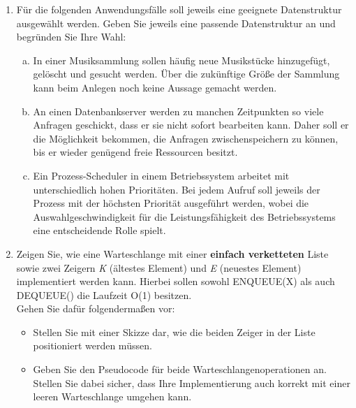 \documentclass{scrartcl}
\begin{document}
\begin{enumerate}[(1)]
\item Für die folgenden Anwendungsfälle soll jeweils eine geeignete Datenstruktur ausgewählt werden. Geben Sie jeweils eine passende Datenstruktur an und begründen Sie Ihre Wahl:
\begin{enumerate}[(a)]
\item In einer Musiksammlung sollen häufig neue Musikstücke hinzugefügt, gelöscht und gesucht werden. Über die zukünftige Größe der Sammlung kann beim Anlegen noch keine Aussage gemacht werden.
\item An einen Datenbankserver werden zu manchen Zeitpunkten so viele Anfragen geschickt, dass er sie nicht sofort bearbeiten kann. Daher soll er die Möglichkeit bekommen, die Anfragen zwischenspeichern zu können, bis er wieder genügend freie Ressourcen besitzt.
\item Ein Prozess-Scheduler in einem Betriebssystem arbeitet mit unterschiedlich hohen Prioritäten. Bei jedem Aufruf soll jeweils der Prozess mit der höchsten Priorität ausgeführt werden, wobei die Auswahlgeschwindigkeit für die Leistungsfähigkeit des Betriebssystems eine entscheidende Rolle spielt.
\end{enumerate}

\item Zeigen Sie, wie eine Warteschlange mit einer \textbf{einfach verketteten} Liste sowie zwei Zeigern \textit{K} (ältestes Element) und \textit{E} (neuestes Element) implementiert werden kann. Hierbei sollen sowohl ENQUEUE(X) als auch DEQUEUE() die Laufzeit O(1) besitzen.\\
Gehen Sie dafür folgendermaßen vor:\\
\begin{itemize}
	\item Stellen Sie mit einer Skizze dar, wie die beiden Zeiger in der Liste positioniert werden müssen.
	\item Geben Sie den Pseudocode für beide Warteschlangenoperationen an. Stellen  Sie dabei sicher, dass Ihre Implementierung auch korrekt mit einer leeren Warteschlange umgehen kann.
\end{itemize}

\end{enumerate}
\end{document}
